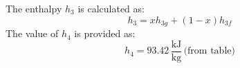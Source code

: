 The enthalpy \( h_3 \) is calculated as:  
\[
h_3 = x h_{3g} + (1 - x) h_{3f}
\]  
The value of \( h_4 \) is provided as:  
\[
h_4 = 93.42 \, \frac{\text{kJ}}{\text{kg}} \, \text{(from table)}
\]